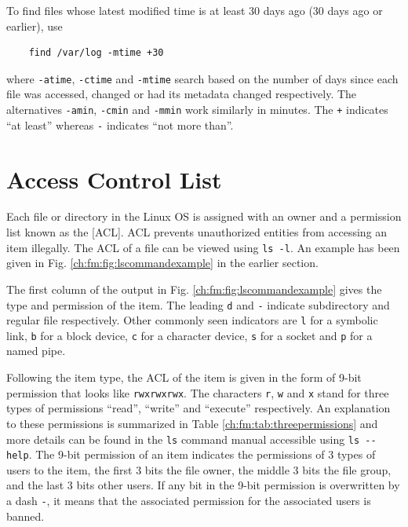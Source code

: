 To find files whose latest modified time is at least 30 days ago (30 days ago or earlier), use
\begin{lstlisting}
	find /var/log -mtime +30
\end{lstlisting}
where \verb|-atime|, \verb|-ctime| and \verb|-mtime| search based on the number of days since each file was accessed, changed or had its metadata changed respectively. The alternatives \verb|-amin|, \verb|-cmin| and \verb|-mmin| work similarly in minutes. The \verb|+| indicates ``at least'' whereas \verb|-| indicates ``not more than''.

\section{Access Control List} \label{ch:fm:sec:accesscontrollist}

Each file or directory in the Linux OS is assigned with an owner and a permission list known as the [ACL]. ACL prevents unauthorized entities from accessing an item illegally. The ACL of a file can be viewed using \verb|ls -l|. An example has been given in Fig. \ref{ch:fm:fig:lscommandexample} in the earlier section.

The first column of the output in Fig. \ref{ch:fm:fig:lscommandexample} gives the type and permission of the item. The leading \verb|d| and \verb|-| indicate subdirectory and regular file respectively. Other commonly seen indicators are \verb|l| for a symbolic link, \verb|b| for a block device, \verb|c| for a character device, \verb|s| for a socket and \verb|p| for a named pipe.

Following the item type, the ACL of the item is given in the form of 9-bit permission that looks like \verb|rwxrwxrwx|. The characters \verb|r|, \verb|w| and \verb|x| stand for three types of permissions ``read'', ``write'' and ``execute'' respectively. An explanation to these permissions is summarized in Table \ref{ch:fm:tab:threepermissions} and more details can be found in the \verb|ls| command manual accessible using \verb|ls --help|. The 9-bit permission of an item indicates the permissions of 3 types of users to the item, the first 3 bits the file owner, the middle 3 bits the file group, and the last 3 bits other users. If any bit in the 9-bit permission is overwritten by a dash \verb|-|, it means that the associated permission for the associated users is banned.

